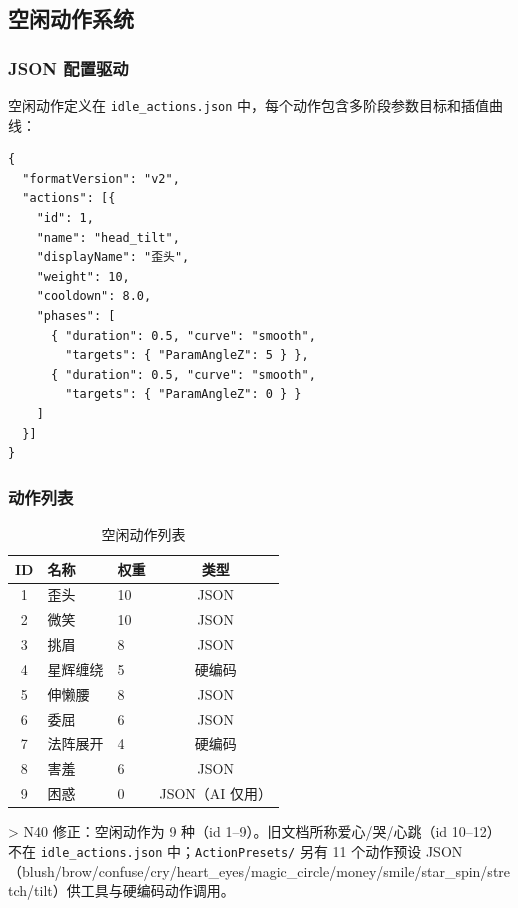 \documentclass[12pt,a4paper]{ctexart}
\begin{document}
\subsection{空闲动作系统}

\subsubsection{JSON 配置驱动}

空闲动作定义在 \texttt{idle\_actions.json} 中，每个动作包含多阶段参数目标和插值曲线：

\begin{lstlisting}[style=json,caption={空闲动作 JSON 配置},label={lst:idle-json}]
{
  "formatVersion": "v2",
  "actions": [{
    "id": 1,
    "name": "head_tilt",
    "displayName": "歪头",
    "weight": 10,
    "cooldown": 8.0,
    "phases": [
      { "duration": 0.5, "curve": "smooth",
        "targets": { "ParamAngleZ": 5 } },
      { "duration": 0.5, "curve": "smooth",
        "targets": { "ParamAngleZ": 0 } }
    ]
  }]
}
\end{lstlisting}

\subsubsection{动作列表}

\begin{table}[H]
\centering
\caption{空闲动作列表}
\label{tab:idle-actions}
\begin{tabular}{cllc}
\toprule
\textbf{ID} & \textbf{名称} & \textbf{权重} & \textbf{类型} \\
\midrule
1 & 歪头 & 10 & JSON \\
2 & 微笑 & 10 & JSON \\
3 & 挑眉 & 8 & JSON \\
4 & 星辉缠绕 & 5 & 硬编码 \\
5 & 伸懒腰 & 8 & JSON \\
6 & 委屈 & 6 & JSON \\
7 & 法阵展开 & 4 & 硬编码 \\
8 & 害羞 & 6 & JSON \\
9 & 困惑 & 0 & JSON（AI 仅用） \\
\bottomrule
\end{tabular}
\end{table}

> N40 修正：空闲动作为 9 种（id 1--9）。旧文档所称爱心/哭/心跳（id 10--12）不在 \texttt{idle\_actions.json} 中；\texttt{ActionPresets/} 另有 11 个动作预设 JSON（blush/brow/confuse/cry/heart\_eyes/magic\_circle/money/smile/star\_spin/stretch/tilt）供工具与硬编码动作调用。
\end{document}
